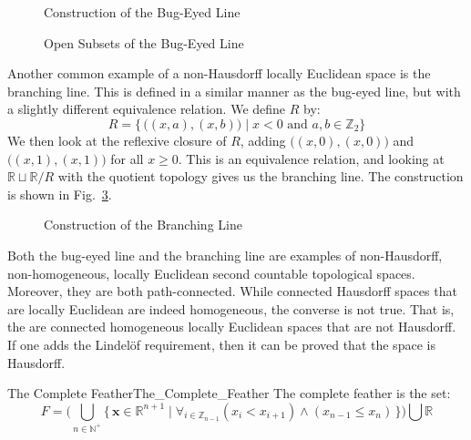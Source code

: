         \begin{figure}[H]
                \centering
                \captionsetup{type=figure}
                
                \caption{Construction of the Bug-Eyed Line}
                \label{fig:Bug_Eyed_Line}
        \end{figure}
        \begin{figure}[H]
                \centering
                \captionsetup{type=figure}
                
                \caption{Open Subsets of the Bug-Eyed Line}
                \label{fig:Open_Neighborhoods_of_Origins_in_Bug_Eyed_Line}
        \end{figure}
        Another common example of a non-Hausdorff locally Euclidean space is
        the branching line. This is defined in a similar manner as the
        bug-eyed line, but with a slightly different equivalence relation.
        We define $R$ by:
        \begin{equation}
                R=\big\{\,\big((x,a),(x,b)\big)\;|\;
                    x<0\textrm{ and }a,b\in\mathbb{Z}_{2}\big\}
        \end{equation}
        We then look at the reflexive closure of $R$, adding
        $\big((x,0),(x,0)\big)$ and $\big((x,1),(x,1)\big)$ for all
        $x\geq{0}$. This is an equivalence relation, and looking at
        $\mathbb{R}\sqcup\mathbb{R}/R$ with the quotient topology gives us
        the branching line. The construction is shown in
        Fig.~\ref{fig:Construction_of_Branching_Line}.
        \begin{figure}[H]
                \centering
                \captionsetup{type=figure}
                
                \caption{Construction of the Branching Line}
                \label{fig:Construction_of_Branching_Line}
        \end{figure}
        Both the bug-eyed line and the branching line are examples of
        non-Hausdorff, non-homogeneous, locally Euclidean second countable
        topological spaces. Moreover, they are both path-connected. While
        connected Hausdorff spaces that are locally Euclidean are indeed
        homogeneous, the converse is not true. That is, the are connected
        homogeneous locally Euclidean spaces that are not Hausdorff. If one
        adds the Lindel\"{o}f requirement, then it can be proved that the
        space is Hausdorff.
        \begin{fdefinition}{The Complete Feather}{The_Complete_Feather}
                The complete feather is the set:
                \begin{equation*}
                    F=\Big(\bigcup_{n\in\mathbb{N}^{+}}
                        \big\{\,\mathbf{x}\in\mathbb{R}^{n+1}\;|\;
                            \forall_{i\in\mathbb{Z}_{n-1}}(x_{i}<x_{i+1})
                            \land(x_{n-1}\leq{x}_{n})\,\big\}\Big)
                        \bigcup\mathbb{R}
                \end{equation*}
        \end{fdefinition}
